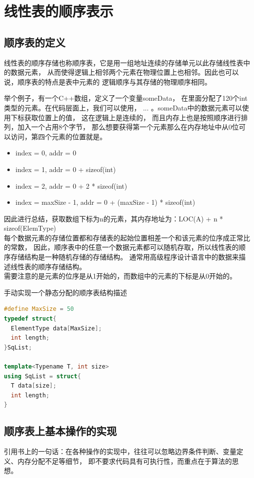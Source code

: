 \documentclass[b5paper,11pt]{article}
\begin{document}
\section{线性表的顺序表示}
\subsection{顺序表的定义}
线性表的顺序存储也称顺序表，它是用一组地址连续的存储单元以此存储线性表中的数据元素，
从而使得逻辑上相邻两个元素在物理位置上也相邻。因此也可以说，顺序表的特点是表中元素的
逻辑顺序与其存储的物理顺序相同。

举个例子，有一个C++数组，定义了一个变量someData，
在里面分配了120个int类型的元素。在代码层面上，我们可以使用，
 ... 。someData中的数据元素可以使用下标获取位置上的值，
这在逻辑上是连续的， 而且内存上也是按照顺序进行排列，加入一个占用8个字节，
那么想要获得第一个元素那么在内存地址中从0位可以访问，第四个元素的位置就是。

\begin{itemize}
  \item index = 0, addr = 0
  \item index = 1, addr = 0 + sizeof(int)
  \item index = 2, addr = 0 + 2 * sizeof(int)
  \item index = maxSize - 1, addr = 0 + (maxSize - 1) * sizeof(int)
\end{itemize}

因此进行总结，获取数组下标为n的元素，其内存地址为：LOC(A) + n * sizeof(ElemType) \\
每个数据元素的存储位置都和存储表的起始位置相差一个和该元素的位序成正常比的常数，
因此，顺序表中的任意一个数据元素都可以随机存取，所以线性表的顺序存储结构是一种随机存储的存储结构。
通常用高级程序设计语言中的数据来描述线性表的顺序存储结构。 \\
需要注意的是元素的位序是从1开始的，而数组中的元素的下标是从0开始的。

手动实现一个静态分配的顺序表结构描述
\begin{lstlisting}[language=C++]
#define MaxSize = 50
typedef struct{
  ElementType data[MaxSize];
  int length;
}SqList;

template<Typename T, int size>
using SqList = struct{
  T data[size];
  int length;
}
\end{lstlisting}

\subsection{顺序表上基本操作的实现}
\begin{cquote}
  引用书上的一句话：在各种操作的实现中，往往可以忽略边界条件判断、变量定义、内存分配不足等细节，
  即不要求代码具有可执行性，而重点在于算法的思想。
\end{cquote}
\end{document}
